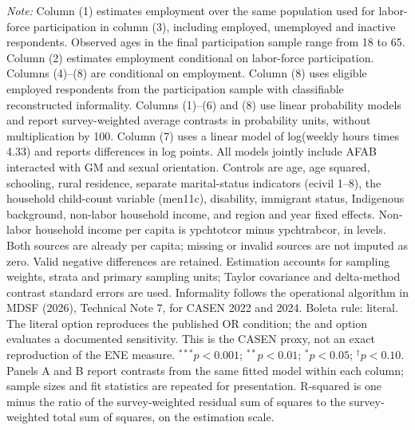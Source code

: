 \begin{table}[htpb!]
\begin{minipage}{\textwidth}
\textit{Note:} Column (1) estimates employment over the same population used for labor-force participation in column (3), including employed, unemployed and inactive respondents. Observed ages in the final participation sample range from 18 to 65. Column (2) estimates employment conditional on labor-force participation. Columns (4)--(8) are conditional on employment.  Column (8) uses eligible employed respondents from the participation sample with classifiable reconstructed informality. Columns (1)--(6) and (8) use linear probability models and report survey-weighted average contrasts in probability units, without multiplication by 100. Column (7) uses a linear model of log(weekly hours times 4.33) and reports differences in log points. All models jointly include AFAB interacted with GM and sexual orientation. Controls are age, age squared, schooling, rural residence, separate marital-status indicators (ecivil 1--8), the household child-count variable (men11c), disability, immigrant status, Indigenous background, non-labor household income, and region and year fixed effects. Non-labor household income per capita is ypchtotcor minus ypchtrabcor, in levels. Both sources are already per capita; missing or invalid sources are not imputed as zero. Valid negative differences are retained. Estimation accounts for sampling weights, strata and primary sampling units; Taylor covariance and delta-method contrast standard errors are used. Informality follows the operational algorithm in MDSF (2026), Technical Note 7, for CASEN 2022 and 2024. Boleta rule: literal. The literal option reproduces the published OR condition; the and option evaluates a documented sensitivity. This is the CASEN proxy, not an exact reproduction of the ENE measure. $^{***}p<0.001$; $^{**}p<0.01$; $^{*}p<0.05$; $^{\dagger}p<0.10$. Panels A and B report contrasts from the same fitted model within each column; sample sizes and fit statistics are repeated for presentation. R-squared is one minus the ratio of the survey-weighted residual sum of squares to the survey-weighted total sum of squares, on the estimation scale.
\end{minipage}
\end{table}
